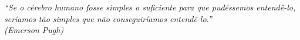\begin{epigrafe}
    \vspace*{\fill}
	\begin{flushright}
		\textit{``Se o cérebro humano fosse simples o suficiente para que pudéssemos entendê-lo, seríamos tão simples que não conseguiríamos entendê-lo.''\\
		          (Emerson Pugh)}
	\end{flushright}
\end{epigrafe}
